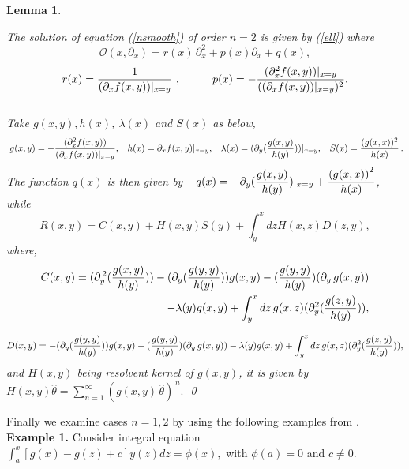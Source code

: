 \documentclass[10pt]{article}
\newcommand{\be}{\begin{equation}}
\newcommand{\ee}{\end{equation}}
\newcommand{\bea}{\begin{eqnarray}}
\newcommand{\eea}{\end{eqnarray}}
\newcommand{\nn}{\nonumber}
\newcommand{\rd}{\partial}
\newtheorem{lem}{Lemma}
\begin{document}
{{\begin{lem}\label{ferdosi2}{The solution of equation (\ref{nsmooth}) of order $n=2$
is given by (\ref{ell}) where \be
\mathcal{O}(x,\rd_{x})=r(x)\,\rd_{x}^2+p(x)\rd_{x}+q(x),\label{expdofi1}\nn\ee
\be r(x)={1\over {(\rd_{x}{f(x,y)})|_{x=y}}}\,\,, \hspace{1cm}
p(x)=-{(\rd_{x}^2{f(x,y)})|_{x=y} \over
((\rd_{x}{f(x,y)})|_{x=y})^2}. \label{expdofi2}\nn\ee \\
Take  $g(x,y), h(x)$, $\lambda(x)$ and $S(x)$ as below, \be\,\,
g(x,y)=-{(\rd_{x}^2{f(x,y)}) \over (\rd_{x}{f(x,y)})|_{x=y}},
\hspace{0.3cm} h(x)=\rd_{x}f(x,y)|_{x=y},\hspace{0.3cm}
\lambda(x)=(\rd_{y}({g(x,y)\over h(y)}))|_{x=y},\hspace{0.3cm}
S(x)={(g(x,x))^2\over h(x)}\,. \label{ex2}\nn\ee
 \be\,\,
\label{ex22}\nn\ee The function  $q(x)$ is then given by
$\hspace{0.3cm}\displaystyle q(x)=-\rd_{y}({g(x,y)\over
h(y)})|_{x=y}+{{(g(x,x))}^{2}\over h(x)}$, while \be
R(x,y)=C(x,y)+H(x,y) S(y)+\int^{x}_{y} dz H(x,z) D(z,y),
\label{adel4}\nn\ee where, \bea C(x,y)=(\rd^{\,2}_{y}({g(x,y)\over
h(y)}))-(\rd_{y}({g(y,y)\over h(y)}))g(x,y)-({g(y,y)\over
h(y)})(\rd_{y}\,g(x,y))\nn\\-\lambda(y) g(x,y)+\int^{x}_{y}
dz\,g(x,z)(\rd^{2}_{y} ({g(z,y)\over h(y)})), \label{adel1}\nn\eea

\be D(x,y)=-(\rd_{y}({g(y,y)\over h(y)}))g(x,y)-({g(y,y)\over
h(y)})(\rd_{y}\,g(x,y))-\lambda(y) g(x,y)+\int^{x}_{y}
dz\,g(x,z)(\rd^{2}_{y} ({g(z,y)\over h(y)})),\label{adel2}\nn\ee and
$H(x,y)$ being resolvent kernel of $g(x,y)$, it is given by
$H(x,y)\widehat{\theta}=\sum^{\infty}_{n=1}(g(x,y)\,\widehat{\theta})^{\,n}.$
\qed\\}
\end{lem}
Finally we examine cases $n=1,2$ by using the following examples
from \cite{polyan}.\\


{\bf Example 1.} Consider integral equation
$\displaystyle\int^{x}_{a}[g(x)-g(z)+c]y(z)
dz=\phi(x),$ with $\phi(a)=0$ and $c\ne0$.\\

}}
\end{document}
